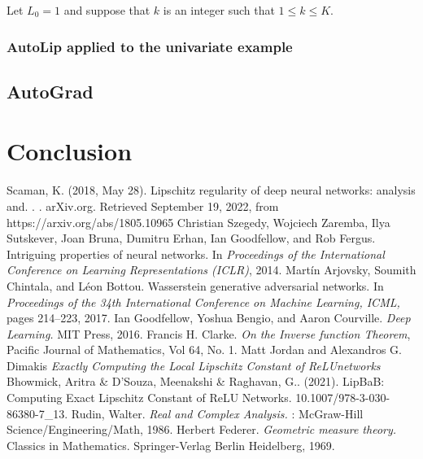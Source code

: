 \documentclass[12pt]{report}
\numberwithin{figure}{chapter}
\theoremstyle{plain}
\theoremstyle{definition}
\theoremstyle{corollary}
\theoremstyle{definition}
\theoremstyle{plain}
\theoremstyle{definition}
\theoremstyle{plain}
\begin{document}
Let \(L_0=1\) and suppose that \(k\) is an integer such that \(1\le k\le K\).

\subsection{AutoLip applied to the univariate example}


\section{AutoGrad}

\chapter{Conclusion}



\newpage



\newpage

\begin{thebibliography}{AA}
 Scaman, K. (2018, May 28). Lipschitz regularity of deep neural networks: analysis and. . . arXiv.org. Retrieved September 19, 2022, from https://arxiv.org/abs/1805.10965
 Christian Szegedy, Wojciech Zaremba, Ilya Sutskever, Joan Bruna, Dumitru Erhan, Ian Goodfellow, and Rob Fergus. Intriguing properties of neural networks.
In {\em Proceedings of the International Conference on Learning Representations (ICLR)}, 2014.
 Martín Arjovsky, Soumith Chintala, and Léon Bottou.
Wasserstein generative adversarial networks.
In {\em Proceedings of the 34th International Conference on Machine Learning, ICML,} pages 214–223, 2017.
 Ian Goodfellow, Yoshua Bengio, and Aaron Courville.
{\em Deep Learning.}
MIT Press, 2016.
 Francis H. Clarke. {\em On the Inverse function Theorem}, Pacific Journal of Mathematics, Vol 64, No. 1.
 Matt Jordan and Alexandros G. Dimakis {\em Exactly Computing the Local Lipschitz Constant of ReLUnetworks}
 Bhowmick, Aritra \& D’Souza, Meenakshi \& Raghavan, G.. (2021). LipBaB: Computing Exact Lipschitz Constant of ReLU Networks. 10.1007/978-3-030-86380-7\_13. 
  Rudin, Walter. {\em Real and Complex Analysis.} : McGraw-Hill Science/Engineering/Math, 1986.
 Herbert Federer. {\em Geometric measure theory.}
    Classics in Mathematics. Springer-Verlag Berlin Heidelberg, 1969.


\end{thebibliography}

%
%
%
%
%
\end{document}
